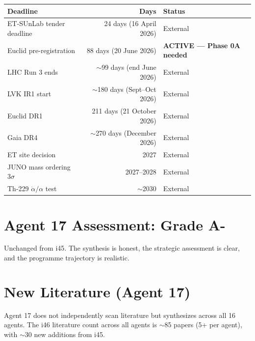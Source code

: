 \documentclass[11pt,a4paper]{article}
\begin{document}
\begin{center}
\begin{tabular}{lrl}
\toprule
\textbf{Deadline} & \textbf{Days} & \textbf{Status} \\
\midrule
ET-SUnLab tender deadline & 24 days (16 April 2026) & External \\
Euclid pre-registration & 88 days (20 June 2026) & \textbf{ACTIVE --- Phase 0A needed} \\
LHC Run 3 ends & $\sim$99 days (end June 2026) & External \\
LVK IR1 start & $\sim$180 days (Sept--Oct 2026) & External \\
Euclid DR1 & 211 days (21 October 2026) & External \\
Gaia DR4 & $\sim$270 days (December 2026) & External \\
ET site decision & 2027 & External \\
JUNO mass ordering $3\sigma$ & 2027--2028 & External \\
Th-229 $\dot{\alpha}/\alpha$ test & $\sim$2030 & External \\
\bottomrule
\end{tabular}
\end{center}

\section{Agent 17 Assessment: Grade A-}

Unchanged from i45. The synthesis is honest, the strategic assessment is clear, and the programme trajectory is realistic.

\section{New Literature (Agent 17)}

Agent 17 does not independently scan literature but synthesizes across all 16 agents. The i46 literature count across all agents is $\sim$85 papers (5+ per agent), with $\sim$30 new additions from i45.
\end{document}
